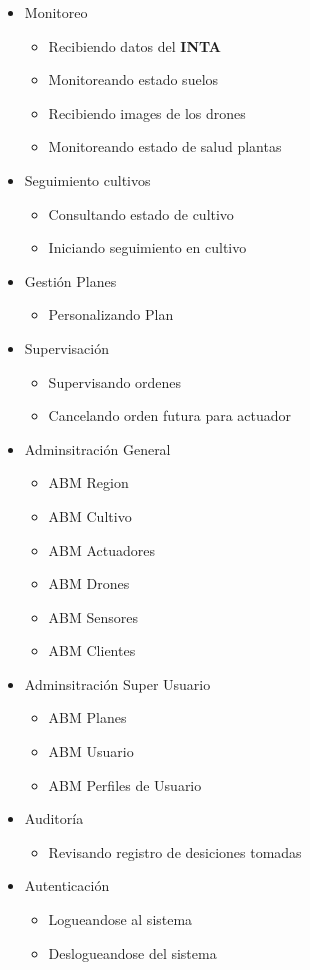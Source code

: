 

\begin{itemize}
 \item Monitoreo
 \begin{itemize}
    \item Recibiendo datos del \textbf{INTA}
    \item Monitoreando estado suelos
    \item Recibiendo images de los drones
    \item Monitoreando estado de salud plantas
 \end{itemize}
 \item Seguimiento cultivos
 \begin{itemize}
  \item Consultando estado de cultivo
  \item Iniciando seguimiento en cultivo
  \end{itemize}
 \item Gesti\'on Planes
 \begin{itemize}
    \item Personalizando Plan
 \end{itemize}
 \item Supervisaci\'on
 \begin{itemize}
  \item Supervisando ordenes
  \item Cancelando orden futura para actuador
 \end{itemize} 
 \item Adminsitraci\'on General
 \begin{itemize}
    \item ABM Region 
    \item ABM Cultivo
    \item ABM Actuadores
    \item ABM Drones
    \item ABM Sensores
    \item ABM Clientes
 \end{itemize}
 \item Adminsitraci\'on Super Usuario
 \begin{itemize}
    \item ABM Planes
    \item ABM Usuario
    \item ABM Perfiles de Usuario
 \end{itemize}
 
 \item Auditor\'ia
 \begin{itemize}
    \item Revisando registro de desiciones tomadas
 \end{itemize}
 \item Autenticaci\'on
 \begin{itemize}
    \item Logueandose al sistema
    \item Deslogueandose del sistema
 \end{itemize}
\end{itemize}

